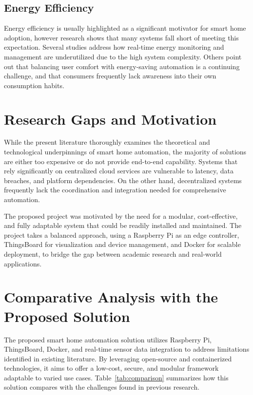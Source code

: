 \documentclass[a4paper,12pt]{report}
\begin{document}
\subsection{Energy Efficiency}
Energy efficiency is usually highlighted as a significant motivator for smart home adoption, however research shows that many systems fall short of meeting this expectation.  Several studies address how real-time energy monitoring and management are underutilized due to the high system complexity\cite{sita2024development}.  Others point out that balancing user comfort with energy-saving automation is a continuing challenge\cite{Sobin_2020}\cite{elmi2023interoperable}, and that consumers frequently lack awareness into their own consumption habits\cite{kaur2024evolution}.




\section{Research Gaps and Motivation}
While the present literature thoroughly examines the theoretical and technological underpinnings of smart home automation, the majority of solutions are either too expensive or do not provide end-to-end capability.  Systems that rely significantly on centralized cloud services are vulnerable to latency, data breaches, and platform dependencies.  On the other hand, decentralized systems frequently lack the coordination and integration needed for comprehensive automation.

 The proposed project was motivated by the need for a modular, cost-effective, and fully adaptable system that could be readily installed and maintained.  The project takes a balanced approach, using a Raspberry Pi as an edge controller, ThingsBoard for visualization and device management, and Docker for scalable deployment, to bridge the gap between academic research and real-world applications.

 \section{Comparative Analysis with the Proposed Solution}

The proposed smart home automation solution utilizes Raspberry Pi, ThingsBoard, Docker, and real-time sensor data integration to address limitations identified in existing literature. By leveraging open-source and containerized technologies, it aims to offer a low-cost, secure, and modular framework adaptable to varied use cases. Table~\ref{tab:comparison} summarizes how this solution compares with the challenges found in previous research.
\end{document}
